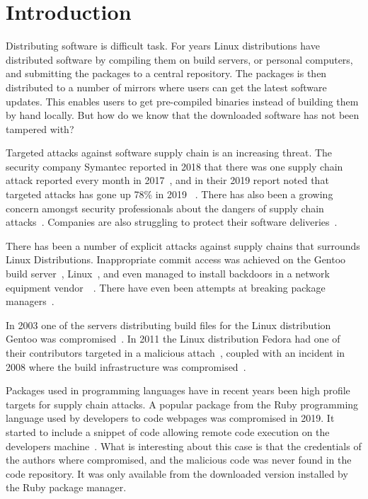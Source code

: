 \documentclass[../Main/thesis.tex]{subfiles}
\begin{document}
\chapter{Introduction}\label{ch:introduction}
Distributing software is difficult task. For years Linux distributions have
distributed software by compiling them on build servers, or personal computers,
and submitting the packages to a central repository. The packages is then
distributed to a number of mirrors where users can get the latest software
updates. This enables users to get pre-compiled binaries instead of building
them by hand locally. But how do we know that the downloaded software has not
been tampered with?

Targeted attacks against software supply chain is an increasing threat.  The
security company Symantec reported in 2018 that there was one supply chain
attack reported every month in 2017~\cite{symantec-istr-2018}, and in their 2019
report noted that targeted attacks has gone up 78\% in 2019
~\cite{symantec-istr-2019}. There has also been a growing concern amongst
security professionals about the dangers of supply chain
attacks~\cite{crowdstrike-supply-chain-attacks}. Companies are also struggling
to protect their software deliveries~\cite{cd-pipelines-case-study}.

There has been a number of explicit attacks against supply chains that surrounds
Linux Distributions. Inappropriate commit access was achieved on the  Gentoo
build server~\cite{gentoo-compromise-2018}, Linux~\cite{linux-compromise-2011},
and even managed to install backdoors in a network equipment
vendor~\cite{Checkoway:2016:SAJ:2976749.2978395}~\cite{juniper-backdoor-advisory}.
There have even been attempts at breaking package
managers~\cite{Cappos:2008:LMA:1455770.1455841}.

In 2003 one of the servers distributing build files for the Linux distribution
Gentoo was compromised~\cite{gentoo-compromise-2003}. In 2011 the Linux
distribution Fedora had one of their contributors targeted in a malicious
attach~\cite{fedora-compromise-2011}, coupled with an incident in 2008 where the
build infrastructure was compromised~\cite{fedora-compromise-2008}.

Packages used in programming languages have in recent years been high profile
targets for supply chain attacks. A popular package from the Ruby programming
language used by developers to code webpages was compromised in 2019. It started
to include a snippet of code allowing remote code execution on the developers
machine~\cite{malicious-ruby}. What is interesting about this case is that the
credentials of the authors where compromised, and the malicious code was never
found in the code repository. It was only available from the downloaded version
installed by the Ruby package manager.
\end{document}
